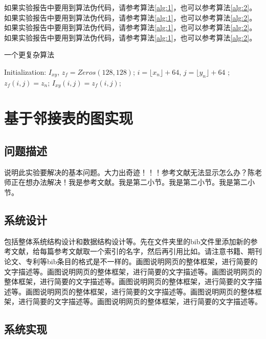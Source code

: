 \documentclass[supercite]{Experimental_Report}
\theoremstyle{definition}
\begin{document}
如果实验报告中要用到算法伪代码，请参考算法\ref{alg:1}，也可以参考算法\ref{alg:2}。如果实验报告中要用到算法伪代码，请参考算法\ref{alg:1}，也可以参考算法\ref{alg:2}。如果实验报告中要用到算法伪代码，请参考算法\ref{alg:1}，也可以参考算法\ref{alg:2}。如果实验报告中要用到算法伪代码，请参考算法\ref{alg:1}，也可以参考算法\ref{alg:2}。

\begin{algorithm}[h] 
	\caption{一个更复杂算法}
	\begin{algorithmic}[1]
		\State Initialization: $I_{xy}$, $z_{f}=Zeros(128, 128)$; 
		\State $i=\lfloor x_n \rfloor+64$, $j=\lfloor y_n \rfloor + 64$
		;
		\State $z_{f}(i,j)=z_n$;
		\EndIf
		\State $I_{xy}(i,j)=z_{f}(i,j)$;
		\EndFor 
	\end{algorithmic}\label{alg:2}
\end{algorithm}

\newpage

\section{基于邻接表的图实现}

\subsection{问题描述}

说明此实验要解决的基本问题。大力出奇迹！！！参考文献无法显示怎么办？陈老师正在想办法解决\cite{STR2021Neurocom, AVS2021Neurocom}！我是参考文献。我是第二小节\cite{Mehrabian1974An}。我是第二小节\cite{Rezaei2014CVPR}。我是第二小节\cite{Ramnath2008IJCV}。

\subsection{系统设计}

包括整体系统结构设计和数据结构设计等。先在文件夹里的bib文件里添加新的参考文献，给每篇参考文献取一个索引的名字，然后再引用比如\cite{STR2021Neurocom}\cite{AVS2021Neurocom, Rezaei2014CVPR}。请注意书籍、期刊论文、专利等bib条目的格式是不一样的。画图说明网页的整体框架，进行简要的文字描述等。画图说明网页的整体框架，进行简要的文字描述等。画图说明网页的整体框架，进行简要的文字描述等。画图说明网页的整体框架，进行简要的文字描述等。画图说明网页的整体框架，进行简要的文字描述等。画图说明网页的整体框架，进行简要的文字描述等。画图说明网页的整体框架，进行简要的文字描述等。

\subsection{系统实现}
\end{document}

